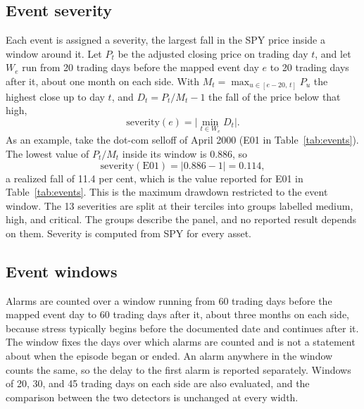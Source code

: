 \documentclass[pdflatex,sn-mathphys-num,iicol]{sn-jnl}
\begin{document}
\subsection{Event severity}
Each event is assigned a severity, the largest fall in the SPY price inside a window around it. Let $P_t$ be the adjusted closing price on trading day $t$, and let $W_e$ run from 20 trading days before the mapped event day $e$ to 20 trading days after it, about one month on each side. With $M_t=\max_{u\in[e-20,\,t]}P_u$ the highest close up to day $t$, and $D_t=P_t/M_t-1$ the fall of the price below that high,
\begin{equation}
\mathrm{severity}(e)=\Big|\min_{t\in W_e} D_t\Big|.
\end{equation}
As an example, take the dot-com selloff of April 2000 (E01 in Table~\ref{tab:events}). The lowest value of $P_t/M_t$ inside its window is $0.886$, so
\begin{equation}
\mathrm{severity}(\mathrm{E01}) = |0.886 - 1| = 0.114,
\end{equation}
a realized fall of 11.4 per cent, which is the value reported for E01 in Table~\ref{tab:events}.
This is the maximum drawdown \cite{magdon2004} restricted to the event window. The 13 severities are split at their terciles into groups labelled medium, high, and critical. The groups describe the panel, and no reported result depends on them. Severity is computed from SPY for every asset.

\subsection{Event windows}
Alarms are counted over a window running from 60 trading days before the mapped event day to 60 trading days after it, about three months on each side, because stress typically begins before the documented date and continues after it. The window fixes the days over which alarms are counted and is not a statement about when the episode began or ended. An alarm anywhere in the window counts the same, so the delay to the first alarm is reported separately. Windows of 20, 30, and 45 trading days on each side are also evaluated, and the comparison between the two detectors is unchanged at every width.
\end{document}
